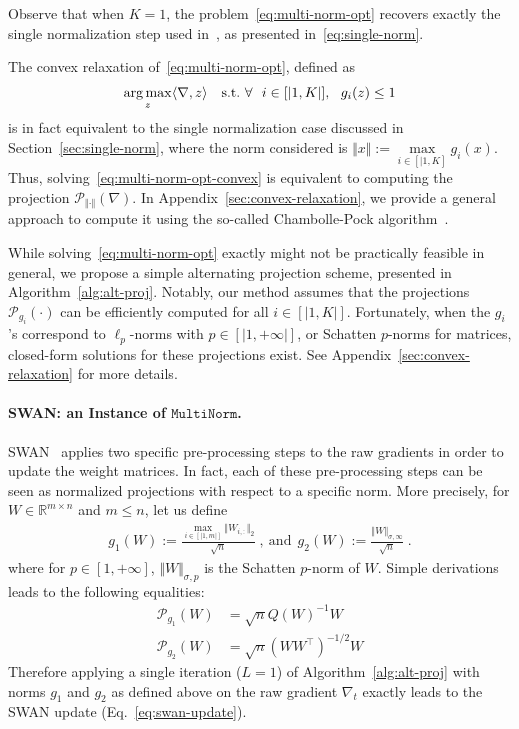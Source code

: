 \begin{remark}
Observe that when $K=1$, the problem~\eqref{eq:multi-norm-opt} recovers exactly the single normalization step used in~\cite{bernstein2024old}, as presented in~\eqref{eq:single-norm}.
\end{remark}

\begin{remark}
The convex relaxation of~\eqref{eq:multi-norm-opt}, defined as  
\begin{align}
\label{eq:multi-norm-opt-convex}
 \operatorname*{arg\,max}_{z} \langle \nabla, z\rangle\quad \text{s.t.}~\forall~~i\in [|1,K|],~~g_i(z)\leq 1
\end{align}
is in fact equivalent to the single normalization case discussed in Section~\ref{sec:single-norm}, where the norm considered is $\Vert x\Vert:=\max\limits_{i\in[|1,K]} g_i(x)$. Thus, solving~\eqref{eq:multi-norm-opt-convex} is equivalent to computing the projection $\mathcal{P}_{\Vert \cdot \Vert}(\nabla)$. In Appendix~\ref{sec:convex-relaxation}, we provide a general approach to compute it using the so-called Chambolle-Pock algorithm~\cite{chambolle2011first}.
\end{remark}

While solving~\eqref{eq:multi-norm-opt} exactly might not be practically feasible in general, we propose a simple alternating projection scheme, 
presented in Algorithm~\ref{alg:alt-proj}. Notably, our method assumes that the projections $\mathcal{P}_{g_i}(\cdot)$  can be efficiently computed for all $i\in[|1,K|]$. Fortunately, when the $g_i$'s correspond to $\ell_p$-norms with $p\in[|1,+\infty|]$, or Schatten $p$-norms for matrices, closed-form solutions for these projections exist. See Appendix~\ref{sec:convex-relaxation} for more details.


\paragraph{SWAN: an Instance of $\texttt{MultiNorm}$.}  SWAN~\cite{ma2024swansgdnormalizationwhitening} applies two specific pre-processing steps to the raw gradients in order to update the weight matrices. In fact, each of these pre-processing steps can be seen as normalized projections with respect to a specific norm. More precisely, for $W\in\mathbb{R}^{m\times n}$ and $m\leq n$, let us define
\begin{align*}
g_1(W):=\frac{\max\limits_{i\in[|1,m|]} \Vert W_{i,:}\Vert_2}{\sqrt{n}}\; ,~ \text{and}~~ 
g_2(W):=\frac{\Vert W\Vert_{\sigma, \infty}}{\sqrt{n}}\; .
\end{align*}
where for $p\in [1,+\infty]$, $\Vert W\Vert_{\sigma,p}$ is the Schatten $p$-norm of $W$. Simple derivations leads to the following equalities:
\begin{align*}
    \mathcal{P}_{g_1}(W)&= \sqrt{n} Q(W)^{-1}W\\
    \mathcal{P}_{g_2}(W)&=\sqrt{n}(WW^\top)^{-1/2}W
\end{align*}
%
Therefore applying a single iteration ($L=1$) of Algorithm~\ref{alg:alt-proj} with norms $g_1$ and $g_2$ as defined above on the raw gradient $\nabla_t$ exactly leads to the SWAN update (Eq.~\eqref{eq:swan-update}).


